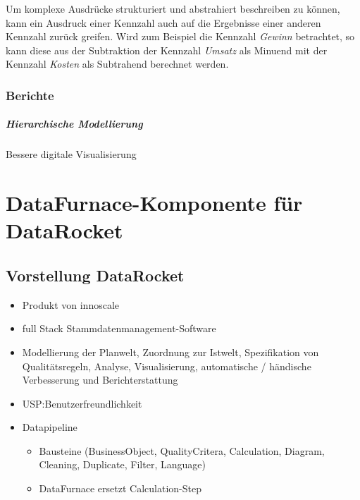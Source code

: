\documentclass[
  language=german, %
  type=bachelor%
]{isthesis}
\begin{document}
\begin{content}
	Um komplexe Ausdrücke strukturiert und abstrahiert beschreiben zu können,
	kann ein Ausdruck einer Kennzahl auch auf die Ergebnisse einer anderen
	Kennzahl zurück greifen. Wird zum Beispiel die Kennzahl \textit{Gewinn}
	betrachtet, so kann diese aus der Subtraktion der Kennzahl \textit{Umsatz}
	als Minuend mit der Kennzahl \textit{Kosten} als Subtrahend berechnet
	werden.


  \subsection{Berichte}

  \paragraph{Hierarchische Modellierung}
  Bessere digitale Visualisierung~\citep[][S. 6 f.]{fleischer2013konstruktion}


  \chapter{DataFurnace-Komponente für DataRocket}

  \section{Vorstellung DataRocket}
\label{sec:Vorstellung-DataRocket}
  \begin{itemize}
    \item Produkt von innoscale
    \item full Stack Stammdatenmanagement-Software
    \item Modellierung der Planwelt, Zuordnung zur Istwelt, Spezifikation von
      Qualitätsregeln, Analyse, Visualisierung, automatische / händische
      Verbesserung und Berichterstattung
    \item USP:\@ Benutzerfreundlichkeit 
    \item Datapipeline
      \begin{itemize}
        \item Bausteine (BusinessObject, QualityCritera, Calculation, Diagram,
          Cleaning, Duplicate, Filter, Language)
        \item DataFurnace ersetzt Calculation-Step
      \end{itemize}
  \end{itemize}



\end{content}
\end{document}
